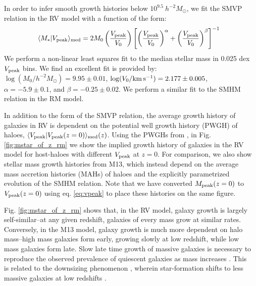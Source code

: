 \documentclass[useAMS,fleqn,usenatbib]{mnras}
\begin{document}
In order to infer smooth growth histories below $10^{9.5}~h^{-2}M_{\odot}$, we fit the SMVP relation in the RV model with a function of the form:
%
\begin{equation}
\label{eq:smvp_relation}
\langle M_* | V_{\rm peak} \rangle_{\rm med} = 2M_0\left(\frac{V_{\rm peak}}{V_0}\right)\left[\left(\frac{V_{\rm peak}}{V_0}\right)^{\alpha}+\left(\frac{V_{\rm peak}}{V_0}\right)^{\beta}\right]^{-1}
\end{equation}
%
We perform a non-linear least squares fit to the median stellar mass in 0.025 dex $V_{\rm peak}$ bins.  We find an excellent fit is provided by: $\log(M_0/h^{-2}M_{\odot})=9.95 \pm 0.01$, $\log(V_0/{\rm km}\, {\rm s}^{-1})=2.177 \pm 0.005$, $\alpha=-5.9 \pm 0.1$, and $\beta=-0.25 \pm 0.02$.  We perform a similar fit to the SMHM relation in the RM model.

In addition to the form of the SMVP relation, the average growth history of galaxies in RV is dependent on the potential well growth history (PWGH) of haloes, $\langle V_{\rm peak}| V_{\rm peak}(z=0) \rangle_{\rm med}(z)$.  Using the PWGHs from \citet{Bosch:2014cu}, in Fig. \ref{fig:mstar_of_z_rm} we show the implied growth history of galaxies in the RV model for host-haloes with different $V_{\rm peak}$ at $z=0$.  For comparison, we also show stellar mass growth histories from M13, which instead depend on the average mass accretion histories (MAHs) of haloes and the explicitly parametrized evolution of the SMHM relation.  Note that we have converted $M_{\rm peak}(z=0)$ to $V_{\rm peak}(z=0)$ using eq. \ref{eq:vpeak} to place these histories on the same figure.  

Fig. \ref{fig:mstar_of_z_rm} shows that, in the RV model, galaxy growth is largely self-similar--at any given redshift, galaxies of every mass grow at similar rates.  Conversely, in the M13 model, galaxy growth is much more dependent on halo mass--high mass galaxies form early, growing slowly at low redshift, while low mass galaxies form late.  Slow late time growth of massive galaxies is necessary to reproduce the observed prevalence of quiescent galaxies as mass increases \citep[e.g.][]{vandenBosch:2008fv, Wetzel:2012lk}.  This is related to the downsizing phenomenon \citep{Neistein:2006fl}, wherein star-formation shifts to less massive galaxies at low redshifts \citep[e.g.][]{Kodama:2004gb, Jimenez:2005gj, Juneau:2005ig, Bell:2005hs, Bundy:2006em}.  
\end{document}
